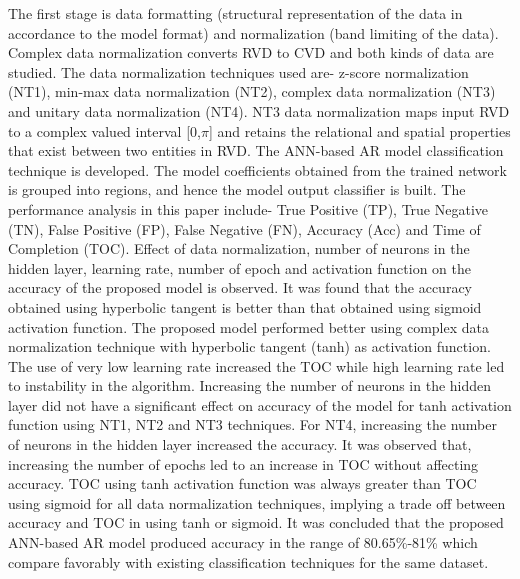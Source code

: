 The first stage is data formatting (structural representation of the data in accordance to the model format) and normalization (band limiting of the data). Complex data normalization converts RVD to CVD and both kinds of data are studied. The data normalization techniques used are- z-score normalization (NT1), min-max data normalization (NT2), complex data normalization (NT3) and unitary data normalization (NT4). NT3 data normalization maps input RVD to a complex valued interval [0,$\pi$] and retains the relational and spatial properties that exist between two entities in RVD.
The ANN-based AR model classification technique is developed.
The model coefficients obtained from the trained network is grouped into regions, and hence the model output classifier is built.
The performance analysis in this paper include- True Positive (TP), True Negative (TN), False Positive (FP), False Negative (FN), Accuracy (Acc) and Time of Completion (TOC).
Effect of data normalization, number of neurons in the hidden layer, learning rate, number of epoch and activation function on the accuracy of the proposed model is observed.
It was found that the accuracy obtained using hyperbolic tangent is better than that obtained using sigmoid activation function.
The proposed model performed better using complex data normalization technique with hyperbolic tangent (tanh) as activation function.
The use of very low learning rate increased the TOC while high learning rate led to instability in the algorithm.
Increasing the number of neurons in the hidden layer did not have a significant effect on accuracy of the model for tanh activation function using NT1, NT2 and NT3 techniques. For NT4, increasing the number of neurons in the hidden layer increased the accuracy.
It was observed that, increasing the number of epochs led to an increase in TOC without affecting accuracy.
TOC using tanh activation function was always greater than TOC using sigmoid for all data normalization techniques, implying a trade off between accuracy and TOC in using tanh or sigmoid.
It was concluded that the proposed ANN-based AR model produced accuracy in the range of 80.65\%-81\% which compare favorably with existing classification techniques for the same dataset. \par \noindent

